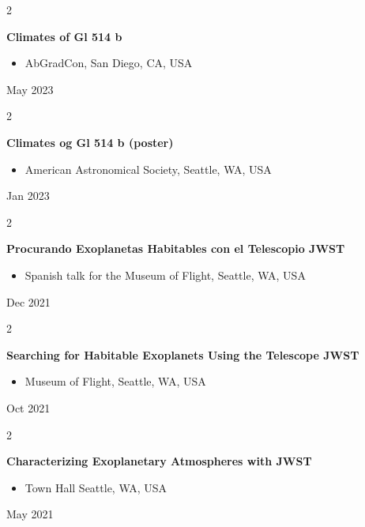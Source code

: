 \documentclass[10pt, letterpaper]{article}
\newenvironment{highlights}{
    \begin{itemize}[
        topsep=0.10 cm,
        parsep=0.10 cm,
        partopsep=0pt,
        itemsep=0pt,
        leftmargin=0.4 cm + 10pt
    ]
}{
    \end{itemize}
} %
\newenvironment{twocolentry}[2][]{
    \onecolentry
    \def\secondColumn{#2}
    \setcolumnwidth{\fill, 4.5 cm}
    \begin{paracol}{2}
}{
    \switchcolumn \raggedleft \secondColumn
    \end{paracol}
    \endonecolentry
} %
\begin{document}
        \begin{twocolentry}{
            May 2023
        }
            \textbf{Climates of Gl 514 b}
            \begin{highlights}
                \item AbGradCon, San Diego, CA, USA
            \end{highlights}
        \end{twocolentry}


        \vspace{0.2 cm}

        \begin{twocolentry}{
            Jan 2023
        }
            \textbf{Climates og Gl 514 b (poster)}
            \begin{highlights}
                \item American Astronomical Society, Seattle, WA, USA
            \end{highlights}
        \end{twocolentry}


        \vspace{0.2 cm}

        \begin{twocolentry}{
            Dec 2021
        }
            \textbf{Procurando Exoplanetas Habitables con el Telescopio JWST}
            \begin{highlights}
                \item Spanish talk for the Museum of Flight, Seattle, WA, USA
            \end{highlights}
        \end{twocolentry}


        \vspace{0.2 cm}

        \begin{twocolentry}{
            Oct 2021
        }
            \textbf{Searching for Habitable Exoplanets Using the Telescope JWST}
            \begin{highlights}
                \item Museum of Flight, Seattle, WA, USA
            \end{highlights}
        \end{twocolentry}


        \vspace{0.2 cm}

        \begin{twocolentry}{
            May 2021
        }
            \textbf{Characterizing Exoplanetary Atmospheres with JWST}
            \begin{highlights}
                \item Town Hall Seattle, WA, USA
            \end{highlights}
        \end{twocolentry}
\end{document}
